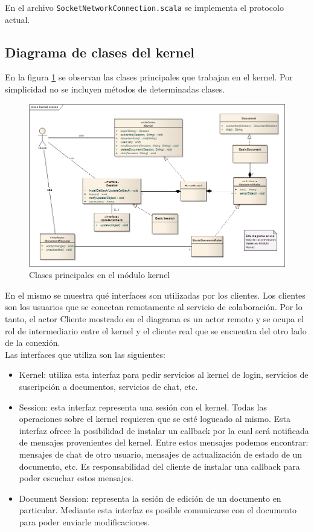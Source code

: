 \documentclass[12pt,a4paper]{article}
\begin{document}
En el archivo \texttt{SocketNetworkConnection.scala} se implementa el protocolo actual.

\subsection{Diagrama de clases del kernel}
En la figura \ref{clases-kernel} se observan las clases principales que trabajan en el kernel. Por simplicidad no se 
incluyen métodos de determinadas clases.

	\begin{figure}[!ht]
		\begin{center}
			\includegraphics[width=14cm]{kernel-clases.png}
			\caption{\label{clases-kernel} Clases principales en el módulo kernel }
		\end{center}
	\end{figure}

En el mismo se muestra qué interfaces son utilizadas por los clientes. Los clientes son los usuarios que se conectan
remotamente al servicio de colaboración. Por lo tanto, el actor Cliente mostrado en el diagrama es un actor remoto y se
ocupa el rol de intermediario entre el kernel y el cliente real que se encuentra del otro lado de la conexión. \\

Las interfaces que utiliza son las siguientes:
\begin{itemize}
	\item Kernel: utiliza esta interfaz para pedir servicios al kernel de login, servicios de suscripción a documentos,
	servicios de chat, etc.

	\item Session: esta interfaz representa una sesión con el kernel. Todas las operaciones sobre el kernel requieren que se
	esté logueado al mismo. Esta interfaz ofrece la posibilidad de instalar un callback por la cual será notificada de mensajes
	provenientes del kernel. Entre estos mensajes podemos encontrar: mensajes de chat de otro usuario, mensajes de actualización
	de estado de un documento, etc. Es responsabilidad del cliente de instalar una callback para poder escuchar estos mensajes.

	\item Document Session: representa la sesión de edición de un documento en particular. Mediante esta interfaz es posible
	comunicarse con el documento para poder enviarle modificaciones.
\end{itemize}
\end{document}
